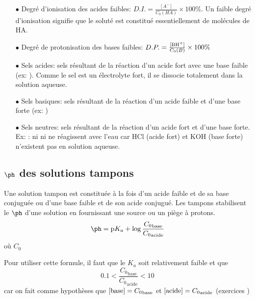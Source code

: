 \begin{itemize}
  \item[$\bullet$] Degré d'ionisation des acides faibles: $D.I.=\frac{[A^{-}]}{C_0(HA)}\times 100\%$.
    Un faible degré d'ionisation signifie que le soluté est constitué essentiellement de molécules de HA.

  \item[$\bullet$] Degré de protonisation des bases faibles: $D.P.=\frac{[\ce{BH+}]}{C_0(B)}\times 100\%$

  \item[$\bullet$] Sels acides: sels résultant de la réaction d'un acide fort avec une base faible (ex: ).
    Comme le sel est un électrolyte fort,
    il se dissocie totalement dans la solution aqueuse.

  \item[$\bullet$] Sels basiques: sels résultant de la réaction d'un acide faible et d'une base forte (ex: )

  \item[$\bullet$] Sels neutres: sels résultant de la réaction d'un acide fort et d'une base forte.
    Ex: : ni  ni  ne réagissent avec l'eau car HCl (acide fort) et KOH (base forte) n'existent pas en solution aqueuse.
\end{itemize}

\subsection{$\ph$ des solutions tampons}
Une solution tampon est constituée à la fois d'un acide faible et de sa base conjuguée ou d'une base faible et de son acide conjugué.
Les tampons stabilisent le $\ph$ d'une solution en fournissant une source ou un piège à protons.
$$\ph = \pka + \log{\frac{{C_0}_\mathrm{base}}{{C_0}_\mathrm{acide}}}$$
où $C_0$

Pour utiliser cette formule,
il faut que le $K_a$ soit relativement faible et que
$$0.1<\frac{{C_0}_\mathrm{base}}{{C_0}_\mathrm{acide}}<10$$
car on fait comme hypothèses que $[\ce{base}]={C_0}_\mathrm{base}$ et $\ce{[acide]}={C_0}_\mathrm{acide}$
(exercices \cite[p.~38]{godard})

